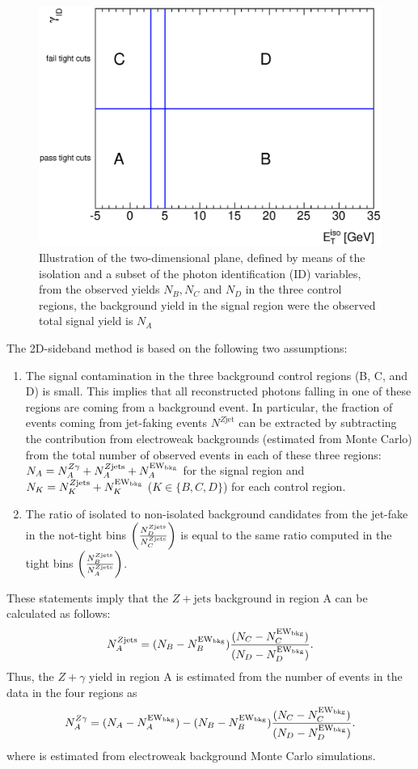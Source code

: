 \begin{figure}[!hbpt]
  \centering
  \includegraphics[scale=0.60]{figures/2dsketch.eps}
  \caption{Illustration of the two-dimensional plane, defined	
      by means of the isolation and a subset of the photon
      identification (ID) variables, from the observed yields $N_{B},
      N_{C}$ and $N_{D}$ in the three control regions, the background
    yield in the signal region were the observed total signal yield is
    $N_{A}$}
\label{fig::2dsketch}
\end{figure}

The 2D-sideband method is based on the following two assumptions: 
\begin{enumerate}
\item The signal contamination in the three background control regions (B, C, and D)
is small. This implies that all reconstructed photons falling in
one of these regions are coming from a background event. In particular, the
fraction of events coming from jet-faking events $N^{Z\text{jet}}$ can be
extracted by subtracting the contribution from electroweak backgrounds 
\New{} (estimated from Monte Carlo) from the total number of
observed events in each of these three regions: $N_A = N_{A}^{Z\gamma} + N_{A}^{Z\text{jets}} + N_{A}^{\text{EW$_{\text{bkg}}$}}$
for the signal region and $N_K = N_{K}^{Z\text{jets}} + N_{K}^{\text{EW$_{\text{bkg}}$}}$ ($K \in \{B, C, D\}$) 
for each control region.
%
\item The ratio of isolated to non-isolated background candidates from the jet-fake
in the not-tight bins $\left(\frac{N_{D}^{Z\text{jets}}}{N_{C}^{Z\text{jets}}}\right)$
is equal to the same ratio computed in the tight bins
$\left(\frac{N_{B}^{Z\text{jets}}}{N_{A}^{Z\text{jets}}}\right)$.
\end{enumerate}
These statements imply that the $Z+\text{jets}$ background in region A can
be calculated as follows:
\begin{equation}
    N_{A}^{Z\text{jets}} = (N_B - N_{B}^{\text{EW$_{\text{bkg}}$}})\frac{(N_C - N_{C}^{\text{EW$_{\text{bkg}}$}})}{(N_D - N_{D}^{\text{EW$_{\text{bkg}}$}})}.
\end{equation}
Thus, the $Z+\gamma$ yield  in region A is estimated from the number
of events in the data in the four regions as
\begin{equation}
   N_{A}^{Z\gamma} = (N_A - N_{A}^{\text{EW$_{\text{bkg}}$}}) - (N_B - N_{B}^{\text{EW$_{\text{bkg}}$}})\frac{(N_C - N_{C}^{\text{EW$_{\text{bkg}}$}})}{(N_D - N_{D}^{\text{EW$_{\text{bkg}}$}})}.
\end{equation}
where \New{} is estimated from electroweak background Monte Carlo simulations.

